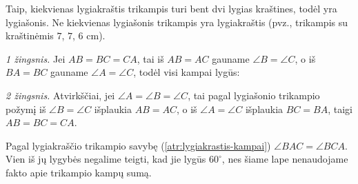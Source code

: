 \documentclass[12pt,a4paper,reqno]{amsart}
\newcommand{\krastineszymek}[1]{\tikz[baseline=(current bounding box.center)]{\foreach \x in {#1}{\draw (\x pt,-2.5pt)--(\x pt,2.5pt);}}}
\theoremstyle{plain}\newtheorem{theorem}{Teorema}[section]
\theoremstyle{definition}
\theoremstyle{remark}\newtheorem{remark}[theorem]{Pastaba}\newtheorem*{remark*}{Pastaba}
\theoremstyle{definition}\newtheorem*{problem*}{Uždavinys}
\begin{document}
\begin{solution}[\ref{uzd:lygiakrastis-supratimas-01}]
Taip, kiekvienas lygiakraštis trikampis turi bent dvi lygias kraštines, todėl yra lygiašonis. Ne kiekvienas lygiašonis trikampis yra lygiakraštis (pvz., trikampis su kraštinėmis $7$, $7$, $6$ cm).
\end{solution}

\begin{solution}[\ref{atr:lygiakrastis-kampai}]
\par\emph{1 žingsnis.} Jei $AB=BC=CA$, tai iš $AB=AC$ gauname $\angle B=\angle C$, o iš $BA=BC$ gauname $\angle A=\angle C$, todėl visi kampai lygūs:
\begin{center}
\end{center}
\par\emph{2 žingsnis.} Atvirkščiai, jei $\angle A=\angle B=\angle C$, tai pagal lygiašonio trikampio požymį iš $\angle B=\angle C$ išplaukia $AB=AC$, o iš $\angle A=\angle C$ išplaukia $BC=BA$, taigi $AB=BC=CA$.
\end{solution}

\begin{solution}[\ref{uzd:lygiakrastis-kampai-01}]
Pagal lygiakraščio trikampio savybę (\ref{atr:lygiakrastis-kampai}) $\angle BAC=\angle BCA$. Vien iš jų lygybės negalime teigti, kad jie lygūs $60^\circ$, nes šiame lape nenaudojame fakto apie trikampio kampų sumą.
\end{solution}
\end{document}
